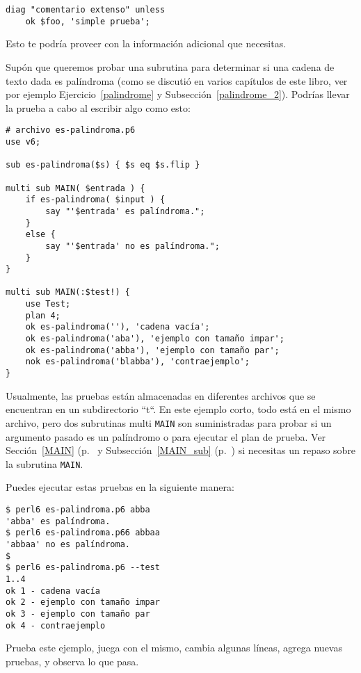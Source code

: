 \begin{verbatim}
diag "comentario extenso" unless
    ok $foo, 'simple prueba';
\end{verbatim}

Esto te podría proveer con la información adicional que 
necesitas.

Supón que queremos probar una subrutina para determinar 
si una cadena de texto dada es palíndroma (como se 
discutió en varios capítulos de este libro, ver por ejemplo
Ejercicio~\ref{palindrome} y Subsección~\ref{palindrome_2}).
Podrías llevar la prueba a cabo al escribir algo como esto:

\begin{verbatim}
# archivo es-palindroma.p6
use v6;

sub es-palindroma($s) { $s eq $s.flip }

multi sub MAIN( $entrada ) {
    if es-palindroma( $input ) {
        say "'$entrada' es palíndroma.";
    }
    else {
        say "'$entrada' no es palíndroma.";
    }
}

multi sub MAIN(:$test!) {
    use Test;
    plan 4;
    ok es-palindroma(''), 'cadena vacía';
    ok es-palindroma('aba'), 'ejemplo con tamaño impar';
    ok es-palindroma('abba'), 'ejemplo con tamaño par';
    nok es-palindroma('blabba'), 'contraejemplo';
}
\end{verbatim}

Usualmente, las pruebas están almacenadas en diferentes archivos
que se encuentran en un subdirectorio ``t``. En este ejemplo corto,
todo está en el mismo archivo, pero dos subrutinas multi {\tt MAIN} 
son suministradas para probar si un argumento pasado es un palíndromo
o para ejecutar el plan de prueba. Ver Sección~\ref{MAIN} (p.~\pageref{MAIN} 
y Subsección~\ref{MAIN_sub} (p.~\pageref{MAIN_sub})
si necesitas un repaso sobre la subrutina {\tt MAIN}.

Puedes ejecutar estas pruebas en la siguiente manera:

\begin{verbatim}
$ perl6 es-palindroma.p6 abba
'abba' es palíndroma.
$ perl6 es-palindroma.p66 abbaa
'abbaa' no es palíndroma.
$
$ perl6 es-palindroma.p6 --test
1..4
ok 1 - cadena vacía
ok 2 - ejemplo con tamaño impar
ok 3 - ejemplo con tamaño par
ok 4 - contraejemplo
\end{verbatim}

Prueba este ejemplo, juega con el mismo, cambia algunas
líneas, agrega nuevas pruebas, y observa lo que pasa.


